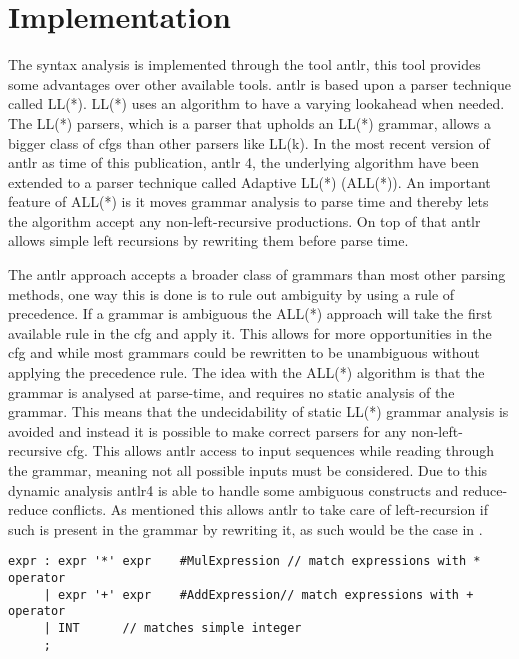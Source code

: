 
\section{Implementation}\label{sec:ANTLR}
The syntax analysis is implemented through the tool \acrfull{antlr}, this tool provides some advantages over other available tools.
\acrshort{antlr} is based upon a parser technique called LL(*).
LL(*) uses an algorithm to have a varying lookahead when needed.
The LL(*) parsers, which is a parser that upholds an LL(*) grammar, allows a bigger class of \acrshort{cfg}s than other parsers like LL(k).
In the most recent version of \acrshort{antlr} as time of this publication, \acrshort{antlr} 4, the underlying algorithm have been extended to a parser technique called Adaptive LL(*) (ALL(*)).
An important feature of ALL(*) is it moves grammar analysis to parse time and thereby lets the algorithm accept any non-left-recursive productions.
On top of that \acrshort{antlr} allows simple left recursions by rewriting them before parse time.

The \acrshort{antlr} approach accepts a broader class of grammars than most other parsing methods, one way this is done is to rule out ambiguity by using a rule of precedence.
If a grammar is ambiguous the ALL(*) approach will take the first available rule in the \acrshort{cfg} and apply it.
This allows for more opportunities in the \acrshort{cfg} and while most grammars could be rewritten to be unambiguous without applying the precedence rule.
The idea with the ALL(*) algorithm is that the grammar is analysed at parse-time, and requires no static analysis of the grammar. 
This means that the undecidability of static LL(*) grammar analysis is avoided and instead it is possible to make correct parsers for any non-left-recursive \acrshort{cfg}.
This allows \acrshort{antlr} access to input sequences while reading through the grammar, meaning not all possible inputs must be considered.
Due to this dynamic analysis \acrshort{antlr}4 is able to handle some ambiguous constructs and reduce-reduce conflicts.
As mentioned this allows \acrshort{antlr} to take care of left-recursion if such is present in the grammar by rewriting it, as such would be the case in .

\begin{lstlisting}[caption=An ambiguous rule for expr,frame=tlrb,label={lst:amb}]
expr : expr '*' expr 	#MulExpression // match expressions with * operator
     | expr '+' expr 	#AddExpression// match expressions with + operator
     | INT 		// matches simple integer
     ;
\end{lstlisting}

